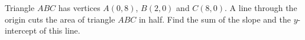 Triangle $ABC$ has vertices $A(0,8)$, $B(2,0)$ and $C(8,0)$. A line through the origin cuts the area of triangle $ABC$ in half. Find the sum of the slope and the $y$-intercept of this line.
